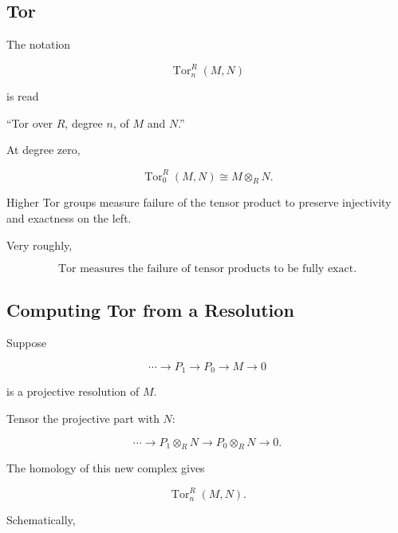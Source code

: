 \subsection{Tor}
\label{subsec:tor}

The notation

\[ \operatorname{Tor}_n^R(M,N) \]

is read

``Tor over \(R\), degree \(n\), of \(M\) and \(N\).''

At degree zero,

\[ \operatorname{Tor}_0^R(M,N)\cong M\otimes_RN. \]

Higher Tor groups measure failure of the tensor product to preserve
injectivity and exactness on the left.

\begin{conceptbox}
Very roughly,

\[ \boxed{\operatorname{Tor}\text{ measures the failure of tensor products
to be fully exact.}} \]
\end{conceptbox}

\subsection{Computing Tor from a Resolution}
\label{subsec:computing-tor}

Suppose

\[ \cdots\to P_1\to P_0\to M\to0 \]

is a projective resolution of \(M\).

Tensor the projective part with \(N\):

\[ \cdots\to P_1\otimes_RN\to P_0\otimes_RN\to0. \]

The homology of this new complex gives

\[ \operatorname{Tor}_n^R(M,N). \]

Schematically,

\begin{center}
\end{center}


